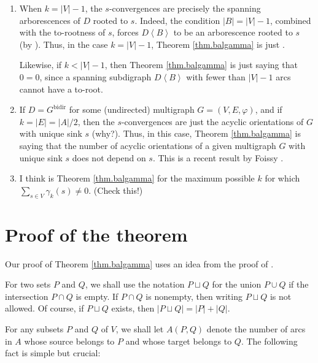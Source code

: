 \documentclass[numbers=enddot,12pt,final,onecolumn,notitlepage]{scrartcl}%
\theoremstyle{definition}
\let\sumnonlimits\sum
\renewcommand{\sum}{\sumnonlimits\limits}
\theoremstyle{plainsl}
\begin{document}
\begin{enumerate}
\item When $k=\left\vert V\right\vert -1$, the $s$-convergences are precisely
the spanning arborescences of $D$ rooted to $s$. Indeed, the condition
$\left\vert B\right\vert =\left\vert V\right\vert -1$, combined with the
to-rootness of $s$, forces $D\left\langle B\right\rangle $ to be an
arborescence rooted to $s$ (by \cite[Theorem 5.10.5]{22s}). Thus, in the case
$k=\left\vert V\right\vert -1$, Theorem \ref{thm.balgamma} is just
\cite[Corollary 5.12.1]{22s}.

Likewise, if $k<\left\vert V\right\vert -1$, then Theorem \ref{thm.balgamma}
is just saying that $0=0$, since a spanning subdigraph $D\left\langle
B\right\rangle $ with fewer than $\left\vert V\right\vert -1$ arcs cannot have
a to-root.

\item If $D=G^{\operatorname*{bidir}}$ for some (undirected) multigraph
$G=\left(  V,E,\varphi\right)  $, and if $k=\left\vert E\right\vert
=\left\vert A\right\vert /2$, then the $s$-convergences are just the acyclic
orientations of $G$ with unique sink $s$ (why?). Thus, in this case, Theorem
\ref{thm.balgamma} is saying that the number of acyclic orientations of a
given multigraph $G$ with unique sink $s$ does not depend on $s$. This is a
recent result by Foissy \cite[Proposition 4.6]{Foissy22}.

\item I think \cite[Proposition 3.7]{PerPha15} is Theorem \ref{thm.balgamma}
for the maximum possible $k$ for which $\sum_{s\in V}\gamma_{k}\left(
s\right)  \neq0$. (Check this!)
\end{enumerate}

\section{Proof of the theorem}

Our proof of Theorem \ref{thm.balgamma} uses an idea from the proof of
\cite[Proposition 3.7]{PerPha15}.

For two sets $P$ and $Q$, we shall use the notation $P\sqcup Q$ for the union
$P\cup Q$ if the intersection $P\cap Q$ is empty. If $P\cap Q$ is nonempty,
then writing $P\sqcup Q$ is not allowed. Of course, if $P\sqcup Q$ exists,
then $\left\vert P\sqcup Q\right\vert =\left\vert P\right\vert +\left\vert
Q\right\vert $.

For any subsets $P$ and $Q$ of $V$, we shall let $A\left(  P,Q\right)  $
denote the number of arcs in $A$ whose source belongs to $P$ and whose target
belongs to $Q$. The following fact is simple but crucial:
\end{document}
